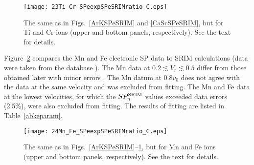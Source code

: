 \documentclass[aps,pra,twocolumn,amsmath,amssymb,floatfix]{revtex4-2}
\begin{document}
\begin{figure}[!h]   %
\begin{center}
\texttt{[image: 23Ti\_Cr\_SPeexpSPeSRIMratio\_C.eps]}
\caption{\label{TiCrSPeSRIM} The same as in Figs.~\ref{ArKSPeSRIM} and \ref{CaScSPeSRIM}, but for Ti and Cr ions (upper and bottom panels, respectively). See the text for details.}
\end{center}
\end{figure}

Figure~\ref{MnFeSPeSRIM} compares the Mn and Fe electronic SP data \cite{Zhang2002,Hvelp68,Lennard86,ShyKum96,Sharma99,Harikumar96,Harikumar97} to SRIM calculations  (data \cite{Zhang2002} were taken from the database \cite{IAEASP}). The Mn data at $0.2 \lesssim V_{r} \lesssim 0.5$ \cite{ShyKum96,Sharma99} differ from those obtained later with minor errors \cite{Zhang2002}. The Mn datum at $0.8v_{0}$ \cite{Lennard86} does not agree with the data \cite{Hvelp68} at the same velocity and was excluded from fitting. The Mn and Fe data \cite{Zhang2002} at the lowest velocities, for which the $SP_{n}^{\rm SRIM}$ values exceeded data errors (2.5\%), were also excluded from fitting. The results of fitting are listed in Table~\ref{abkeparam}.

\begin{figure}[!h]   %
\begin{center}
\texttt{[image: 24Mn\_Fe\_SPeexpSPeSRIMratio\_C.eps]}
\caption{\label{MnFeSPeSRIM} The same as in Figs.~\ref{ArKSPeSRIM}--\ref{TiCrSPeSRIM}, but for Mn and Fe ions (upper and bottom panels, respectively). See the text for details.}
\end{center}
\end{figure}
\end{document}
